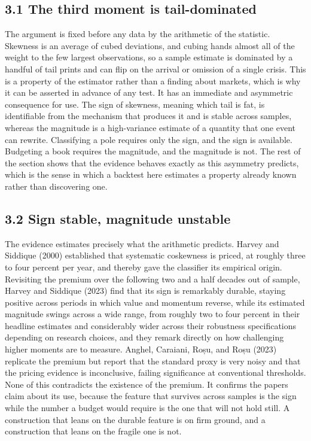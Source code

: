 \documentclass[12pt, a4paper]{article}
\begin{document}
\subsection*{3.1 The third moment is
tail-dominated}\label{the-third-moment-is-tail-dominated}

The argument is fixed before any data by the arithmetic of the
statistic. Skewness is an average of cubed deviations, and cubing hands
almost all of the weight to the few largest observations, so a sample
estimate is dominated by a handful of tail prints and can flip on the
arrival or omission of a single crisis. This is a property of the
estimator rather than a finding about markets, which is why it can be
asserted in advance of any test. It has an immediate and asymmetric
consequence for use. The sign of skewness, meaning which tail is fat, is
identifiable from the mechanism that produces it and is stable across
samples, whereas the magnitude is a high-variance estimate of a quantity
that one event can rewrite. Classifying a pole requires only the sign,
and the sign is available. Budgeting a book requires the magnitude, and
the magnitude is not. The rest of the section shows that the evidence
behaves exactly as this asymmetry predicts, which is the sense in which
a backtest here estimates a property already known rather than
discovering one.

\subsection*{3.2 Sign stable, magnitude
unstable}\label{sign-stable-magnitude-unstable}

The evidence estimates precisely what the arithmetic predicts. Harvey
and Siddique (2000) established that systematic coskewness is priced, at
roughly three to four percent per year, and thereby gave the classifier
its empirical origin. Revisiting the premium over the following two and
a half decades out of sample, Harvey and Siddique (2023) find that its
sign is remarkably durable, staying positive across periods in which
value and momentum reverse, while its estimated magnitude swings across
a wide range, from roughly two to four percent in their headline
estimates and considerably wider across their robustness specifications
depending on research choices, and they remark directly on how
challenging higher moments are to measure. Anghel, Caraiani, Roșu, and
Roșu (2023) replicate the premium but report that the standard proxy is
very noisy and that the pricing evidence is inconclusive, failing
significance at conventional thresholds. None of this contradicts the
existence of the premium. It confirms the paper\textquotesingle s claim
about its use, because the feature that survives across samples is the
sign while the number a budget would require is the one that will not
hold still. A construction that leans on the durable feature is on firm
ground, and a construction that leans on the fragile one is not.
\end{document}
